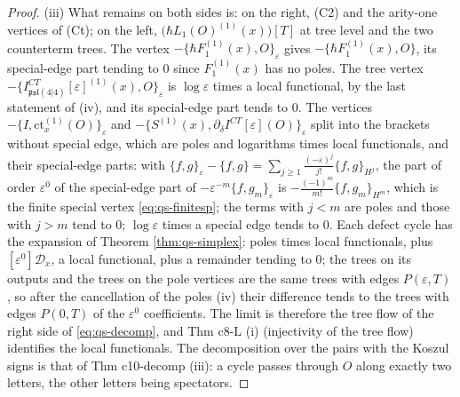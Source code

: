 \begin{proof}
(iii) What remains on both sides is: on the right, (C2) and the arity-one vertices of (Ct); on the left, $\big(\hbar L_1(O)^{(1)}(x)\big)[T]$ at tree level and the two counterterm trees. The vertex $-\{\hbar F_1^{(1)}(x),O\}_\varepsilon$ gives $-\{\hbar F_1^{(1)}(x),O\}$, its special-edge part tending to $0$ since $F_1^{(1)}(x)$ has no poles. The tree vertex $-\{I^{CT}_{\mathfrak{psl}(4|4)}[\varepsilon]^{(1)}(x),O\}_\varepsilon$ is $\log\varepsilon$ times a local functional, by the last statement of (iv), and its special-edge part tends to $0$. The vertices $-\{I,\mathrm{ct}^{(1)}_x(O)\}_\varepsilon$ and $-\{S^{(1)}(x),\partial_\delta I^{CT}[\varepsilon](O)\}_\varepsilon$ split into the brackets without special edge, which are poles and logarithms times local functionals, and their special-edge parts: with $\{f,g\}_\varepsilon-\{f,g\}=\sum_{j\ge1}\frac{(-\varepsilon)^j}{j!}\{f,g\}_{H^j}$, the part of order $\varepsilon^0$ of the special-edge part of $-\varepsilon^{-m}\{f,g_m\}_\varepsilon$ is $-\frac{(-1)^m}{m!}\{f,g_m\}_{H^m}$, which is the finite special vertex \eqref{eq:qs-finitesp}; the terms with $j<m$ are poles and those with $j>m$ tend to $0$; $\log\varepsilon$ times a special edge tends to $0$. Each defect cycle has the expansion of Theorem \ref{thm:qs-simplex}: poles times local functionals, plus $[\varepsilon^0]\mathcal D_x$, a local functional, plus a remainder tending to $0$; the trees on its outputs and the trees on the pole vertices are the same trees with edges $P(\varepsilon,T)$, so after the cancellation of the poles (iv) their difference tends to the trees with edges $P(0,T)$ of the $\varepsilon^0$ coefficients. The limit is therefore the tree flow of the right side of \eqref{eq:qs-decomp}, and Thm c8-L (i) (injectivity of the tree flow) identifies the local functionals. The decomposition over the pairs with the Koszul signs is that of Thm c10-decomp (iii): a cycle passes through $O$ along exactly two letters, the other letters being spectators.


\end{proof}
